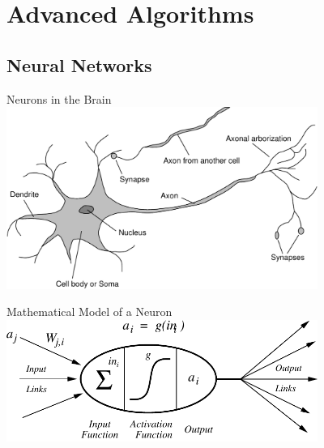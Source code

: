 \documentclass[12pt]{beamer}
\begin{document}
\section{Advanced Algorithms}


\subsection{Neural Networks}
\begin{frame}{Neurons in the Brain}
	\includegraphics[width=4in]{neuron}
\end{frame}
\begin{frame}{Mathematical Model of a Neuron}
	\includegraphics[width=4in]{neuron-unit}
\end{frame}
\end{document}
